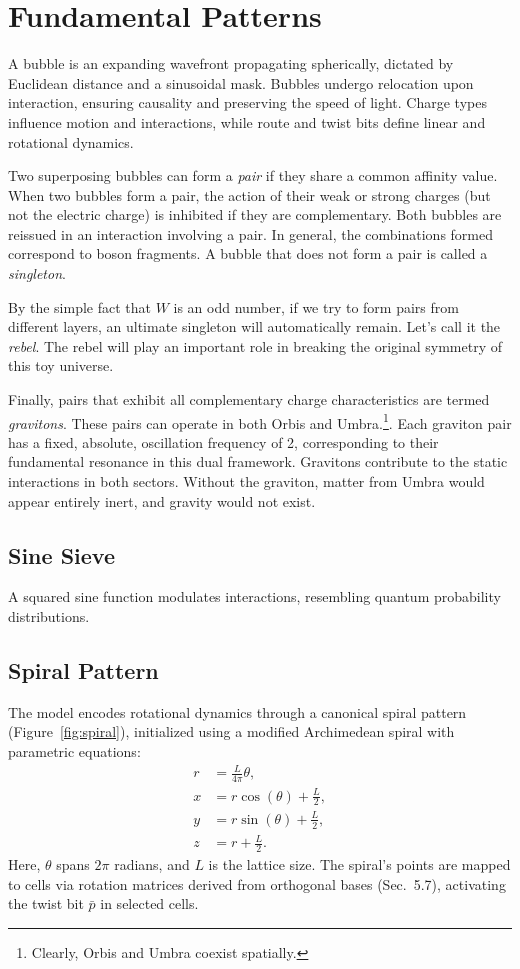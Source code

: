 \documentclass[12pt]{article}
\begin{document}
\section{Fundamental Patterns}
A bubble is an expanding wavefront propagating spherically, dictated by Euclidean distance and a sinusoidal mask. Bubbles undergo relocation upon interaction, ensuring causality and preserving the speed of light. Charge types influence motion and interactions, while route and twist bits define linear and rotational dynamics.

Two superposing bubbles can form a \emph{pair} if they share a common affinity value. When two bubbles form a pair, the action of their weak or strong charges (but not the electric charge) is inhibited if they are complementary. Both bubbles are reissued in an interaction involving a pair. In general, the combinations formed correspond to boson fragments. A bubble that does not form a pair is called a \textit{singleton}.

By the simple fact that $W$ is an odd number, if we try to form pairs from different layers, an ultimate singleton will automatically remain. Let's call it the \textit{rebel}. The rebel will play an important role in breaking the original symmetry of this toy universe.

Finally, pairs that exhibit all complementary charge characteristics are termed \emph{gravitons}. These pairs can operate in both Orbis and Umbra.\footnote{Clearly, Orbis and Umbra coexist spatially.}. Each graviton pair has a fixed, absolute, oscillation frequency of 2, corresponding to their fundamental resonance in this dual framework. Gravitons contribute to the static interactions in both sectors. Without the graviton, matter from Umbra would appear entirely inert, and gravity would not exist. 

\subsection{Sine Sieve}
A squared sine function modulates interactions, resembling quantum probability distributions.

\subsection{Spiral Pattern}
The model encodes rotational dynamics through a canonical spiral pattern (Figure~\ref{fig:spiral}), initialized using a modified Archimedean spiral with parametric equations:
\begin{align}
    r &= \frac{L}{4\pi}\theta, \nonumber \\
    x &= r\cos(\theta) + \frac{L}{2}, \nonumber \\
    y &= r\sin(\theta) + \frac{L}{2}, \nonumber \\
    z &= r + \frac{L}{2}. \label{eq:spiral}
\end{align}
Here, \( \theta \) spans \( 2\pi \) radians, and \( L \) is the lattice size. The spiral’s points are mapped to cells via rotation matrices derived from orthogonal bases (Sec.~5.7), activating the twist bit \( \bar{p} \) in selected cells. 
\end{document}
